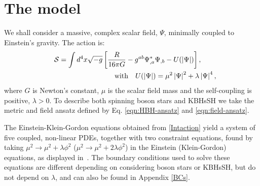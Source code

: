  
\section{The model}
\label{SIsec_model}
 
We shall consider a massive, complex scalar field, $\Psi$, minimally coupled to Einstein's gravity. The action is:
%
\begin{eqnarray}
  \label{Intaction}
  &&
	\mathcal{S} = \int d^4x \sqrt{-g}\left[\frac{R}{16\pi G}- g^{ab}\Psi^*_{,a}\Psi_{,b} - U(|\Psi|)\right],~~{~~} \ \  
\\
\label{pot}
&&~~~~{\rm with}~~~U(|\Psi|)= \mu^2\left|\Psi\right|^2 + \lambda\left|\Psi\right|^4,
\end{eqnarray}  
where $G$ is Newton's constant, $\mu$ is the scalar field mass and the self-coupling is positive, $ \lambda>0$. 
%
To describe both spinning boson stars and KBHsSH we take the metric and field ansatz defined by Eq. \eqref{eqn:HBH-ansatz} and \eqref{eqn:field-ansatz}.

The Einstein-Klein-Gordon equations obtained from \eqref{Intaction} yield a system of five coupled, non-linear PDEs, together with two constraint equations, found 
by taking $\mu^2\to \mu^2+ \lambda \phi^2$ ($\mu^2\to \mu^2+2\lambda \phi^2$) in the Einstein (Klein-Gordon) equations, as displayed in~\cite{Herdeiro:2015gia}.
The boundary conditions used to solve these
equations are different depending on considering boson stars or KBHsSH, but do not depend on $\lambda$, and can also be found in Appendix \ref{BCs}.


